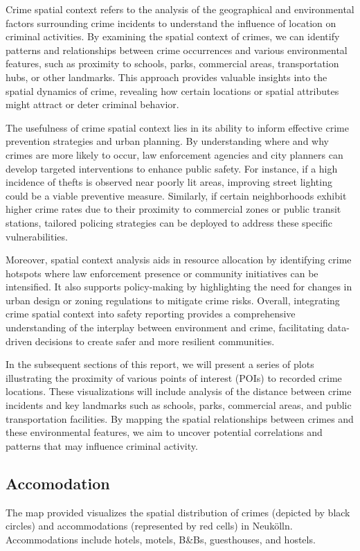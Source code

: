 Crime spatial context refers to the analysis of the geographical and environmental factors surrounding crime incidents to understand the influence of location on criminal activities. By examining the spatial context of crimes, we can identify patterns and relationships between crime occurrences and various environmental features, such as proximity to schools, parks, commercial areas, transportation hubs, or other landmarks. This approach provides valuable insights into the spatial dynamics of crime, revealing how certain locations or spatial attributes might attract or deter criminal behavior. 

 The usefulness of crime spatial context lies in its ability to inform effective crime prevention strategies and urban planning. By understanding where and why crimes are more likely to occur, law enforcement agencies and city planners can develop targeted interventions to enhance public safety. For instance, if a high incidence of thefts is observed near poorly lit areas, improving street lighting could be a viable preventive measure. Similarly, if certain neighborhoods exhibit higher crime rates due to their proximity to commercial zones or public transit stations, tailored policing strategies can be deployed to address these specific vulnerabilities. 

 Moreover, spatial context analysis aids in resource allocation by identifying crime hotspots where law enforcement presence or community initiatives can be intensified. It also supports policy-making by highlighting the need for changes in urban design or zoning regulations to mitigate crime risks. Overall, integrating crime spatial context into safety reporting provides a comprehensive understanding of the interplay between environment and crime, facilitating data-driven decisions to create safer and more resilient communities. 

In the subsequent sections of this report, we will present a series of plots illustrating the proximity of various points of interest (POIs) to recorded crime locations. These visualizations will include analysis of the distance between crime incidents and key landmarks such as schools, parks, commercial areas, and public transportation facilities. By mapping the spatial relationships between crimes and these environmental features, we aim to uncover potential correlations and patterns that may influence criminal activity. 

\subsection{Accomodation}
The map provided visualizes the spatial distribution of crimes (depicted by black circles) and accommodations (represented by red cells) in Neukölln. Accommodations include hotels, motels, B\&Bs, guesthouses, and hostels.  

